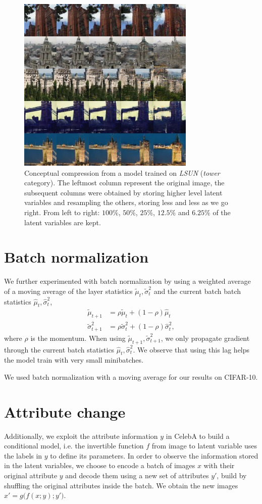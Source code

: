 \documentclass{article}
\begin{document}
\begin{figure}[H]
    \centering \includegraphics[width=.5\textwidth]{tower_compression.jpg}
    \caption{Conceptual compression from a model trained on \emph{LSUN} (\emph{tower} category). The leftmost column represent the original image, the subsequent columns were obtained by storing higher level latent variables and resampling the others, storing less and less as we go right. From left to right: $100\%$, $50\%$, $25\%$, $12.5\%$ and $6.25\%$ of the latent variables are kept.}
\end{figure}

\section{Batch normalization} \label{sec batch norm}
We further experimented with batch normalization by using a weighted average of a moving average of the layer statistics $\tilde{\mu}_{t}, \tilde{\sigma}^{2}_{t}$ and the current batch batch statistics $\hat{\mu}_{t}, \hat{\sigma}_{t}^{2}$,
\begin{align}
\tilde{\mu}_{t+1} &= \rho \tilde{\mu}_{t} + (1 - \rho) \hat{\mu}_{t} \\
\tilde{\sigma}^2_{t+1} &= \rho \tilde{\sigma}^2_{t} + (1 - \rho) \hat{\sigma}^2_{t},
\end{align}
where $\rho$ is the momentum.
When using $\tilde{\mu}_{t+1}, \tilde{\sigma}_{t+1}^{2}$, we only propagate gradient through the current batch statistics $\hat{\mu}_{t}, \hat{\sigma}_{t}^{2}$. We observe that using this lag helps the model train with very small minibatches.

We used batch normalization with a moving average for our results on CIFAR-10.

\section{Attribute change}\label{app attr change}
Additionally, we exploit the attribute information $y$ in CelebA to build a conditional model, i.e. the invertible function $f$ from image to latent variable uses the labels in $y$ to define its parameters. In order to observe the information stored in the latent variables, we choose to encode a batch of images $x$ with their original attribute $y$ and decode them using a new set of attributes $y'$, build by shuffling the original attributes inside the batch. We obtain the new images $x' = g\big(f(x; y); y'\big)$.
\end{document}
